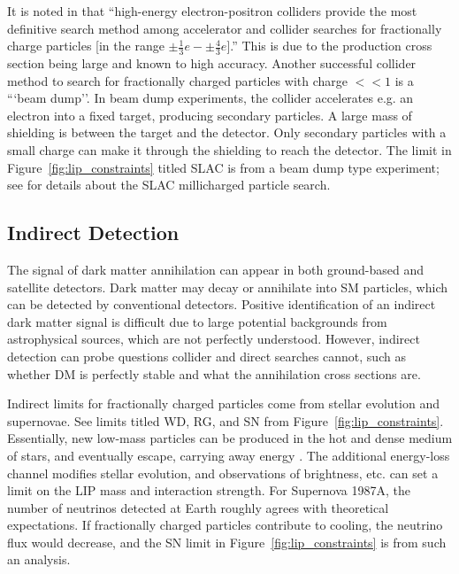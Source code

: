 It is noted in \cite{Perl2009} that ``high-energy electron-positron colliders provide the most definitive search method among accelerator and collider searches for fractionally charge particles [in the range $\pm\frac{1}{3}e -\pm \frac{4}{3}e$].'' This is due to the production cross section being large and known to high accuracy. Another successful collider method to search for fractionally charged particles with charge $<<1$ is a ```beam dump''. In beam dump experiments, the collider accelerates e.g. an electron into a fixed target, producing secondary particles. A large mass of shielding is between the target and the detector. Only secondary particles with a small charge can make it through the shielding to reach the detector. The limit in Figure~\ref{fig:lip_constraints} titled SLAC is from a beam dump type experiment; see \cite{Prinz1998} for details about the SLAC millicharged particle search.

\subsection{Indirect Detection}
The signal of dark matter annihilation can appear in both ground-based and satellite detectors. Dark matter may decay or annihilate into \ac{SM} particles, which can be detected by conventional detectors. Positive identification of an indirect dark matter signal is difficult due to large potential backgrounds from astrophysical sources, which are not perfectly understood. However, indirect detection can probe questions collider and direct searches cannot, such as whether \ac{DM} is perfectly stable and what the annihilation cross sections are. 

Indirect limits for fractionally charged particles come from stellar evolution and supernovae. See limits titled WD, RG, and SN from Figure~\ref{fig:lip_constraints}. Essentially, new low-mass particles can be produced in the hot and dense medium of stars, and eventually escape, carrying away energy \cite{Davidson2000}. The additional energy-loss channel modifies stellar evolution, and observations of brightness, etc. can set a limit on the \ac{LIP} mass and interaction strength. For Supernova 1987A, the number of neutrinos detected at Earth roughly agrees with theoretical expectations. If fractionally charged particles contribute to cooling, the neutrino flux would decrease, and the SN limit in Figure~\ref{fig:lip_constraints} is from such an analysis.

